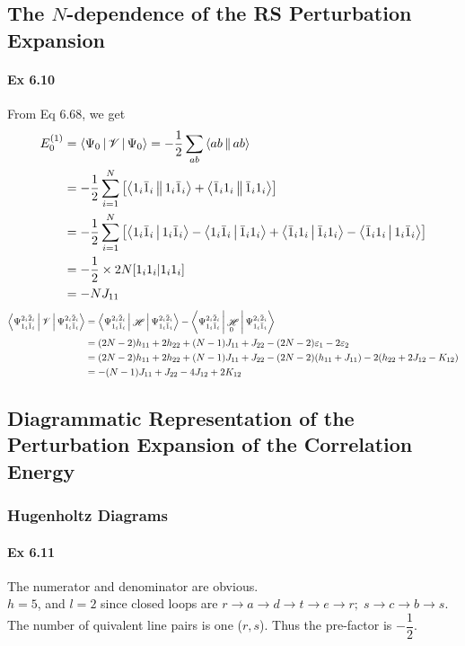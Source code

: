 \documentclass[a4paper]{article}
\DeclareMathOperator{\ra}{\rightarrow}
\DeclareMathOperator{\sH}{\mathscr{H}}
\newcommand{\ex}[1]{\paragraph{Ex #1}}
\numberwithin{equation}{subsection}
\begin{document}
\subsection{The $ N $-dependence of the RS Perturbation Expansion}
\ex{6.10}
From Eq 6.68, we get
\begin{align}
E_0^{(1)} &= \Braket{\Psi_0 | \mathscr{V} | \Psi_0} = -\dfrac{1}{2}\sum_{ab}\Braket{ab||ab} \notag\\
&= -\dfrac{1}{2}\sum_{i=1}^N \qty[\Braket{1_i \bar{1}_i|| 1_i \bar{1}_i} + \Braket{\bar{1}_i 1_i || \bar{1}_i 1_i}] \notag\\
&= -\dfrac{1}{2}\sum_{i=1}^N 
\qty[\Braket{1_i \bar{1}_i| 1_i \bar{1}_i} 
- \Braket{1_i \bar{1}_i| \bar{1}_i 1_i} 
+ \Braket{\bar{1}_i 1_i | \bar{1}_i 1_i}
- \Braket{\bar{1}_i 1_i | 1_i \bar{1}_i} ] \notag\\
&= -\dfrac{1}{2}\times 2N [1_i 1_i| 1_i 1_i] \notag\\
&= -N J_{11}
\end{align}
\begin{align}
\Braket{\Psi_{1_i\bar{1}_i}^{2_i\bar{2}_i} | \mathscr{V} | \Psi_{1_i\bar{1}_i}^{2_i\bar{2}_i}} 
&= \Braket{\Psi_{1_i\bar{1}_i}^{2_i\bar{2}_i} | \sH | \Psi_{1_i\bar{1}_i}^{2_i\bar{2}_i}} 
- \Braket{\Psi_{1_i\bar{1}_i}^{2_i\bar{2}_i} | \sH_0 | \Psi_{1_i\bar{1}_i}^{2_i\bar{2}_i}} \notag\\
&= (2N-2) h_{11} + 2h_{22} + (N-1)J_{11} + J_{22} - (2N-2)\varepsilon_1 - 2\varepsilon_2 \notag\\
&= (2N-2) h_{11} + 2h_{22} + (N-1)J_{11} + J_{22} - (2N-2)(h_{11} + J_{11}) - 2(h_{22} + 2J_{12} - K_{12}) \notag\\
&= -(N-1)J_{11} + J_{22} - 4J_{12} + 2K_{12}
\end{align}

\subsection{Diagrammatic Representation of the Perturbation Expansion of the Correlation Energy}

\subsubsection{Hugenholtz Diagrams}
\ex{6.11}
The numerator and denominator are obvious.\\
$ h=5 $, and $ l=2 $ since closed loops are $ r\ra a\ra d\ra t\ra e\ra r; \; s\ra c\ra b\ra s $. The number of quivalent line pairs is one ($ r,s $). Thus the pre-factor is $ -\dfrac{1}{2} $.
\end{document}
